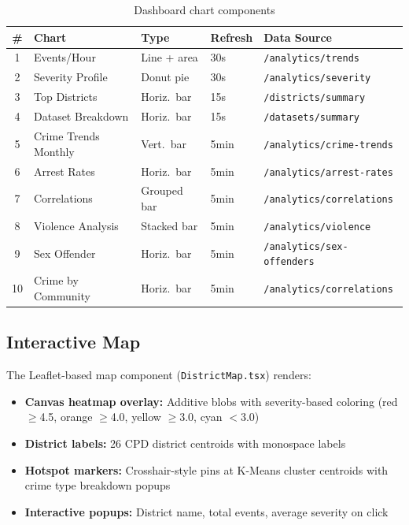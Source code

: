 \documentclass[12pt,a4paper]{article}
\begin{document}
\begin{table}[H]
\centering
\caption{Dashboard chart components}
\begin{tabularx}{\textwidth}{c l l l X}
\toprule
\textbf{\#} & \textbf{Chart} & \textbf{Type} & \textbf{Refresh} & \textbf{Data Source} \\
\midrule
1 & Events/Hour & Line + area & 30s & \texttt{/analytics/trends} \\
2 & Severity Profile & Donut pie & 30s & \texttt{/analytics/severity} \\
3 & Top Districts & Horiz.\ bar & 15s & \texttt{/districts/summary} \\
4 & Dataset Breakdown & Horiz.\ bar & 15s & \texttt{/datasets/summary} \\
5 & Crime Trends Monthly & Vert.\ bar & 5min & \texttt{/analytics/crime-trends} \\
6 & Arrest Rates & Horiz.\ bar & 5min & \texttt{/analytics/arrest-rates} \\
7 & Correlations & Grouped bar & 5min & \texttt{/analytics/correlations} \\
8 & Violence Analysis & Stacked bar & 5min & \texttt{/analytics/violence} \\
9 & Sex Offender & Horiz.\ bar & 5min & \texttt{/analytics/sex-offenders} \\
10 & Crime by Community & Horiz.\ bar & 5min & \texttt{/analytics/correlations} \\
\bottomrule
\end{tabularx}
\end{table}

\subsection{Interactive Map}

The Leaflet-based map component (\texttt{DistrictMap.tsx}) renders:
\begin{itemize}
  \item \textbf{Canvas heatmap overlay:} Additive blobs with severity-based coloring (red $\geq$4.5, orange $\geq$4.0, yellow $\geq$3.0, cyan $<$3.0)
  \item \textbf{District labels:} 26 CPD district centroids with monospace labels
  \item \textbf{Hotspot markers:} Crosshair-style pins at K-Means cluster centroids with crime type breakdown popups
  \item \textbf{Interactive popups:} District name, total events, average severity on click
\end{itemize}
\end{document}
